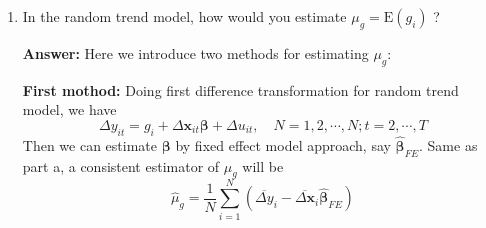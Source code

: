 \begin{enumerate}
\begin{enumerate}
        \item In the random trend model, how would you estimate $\mu_{g}=\mathrm{E}\left(g_{i}\right)$ ?
        
        \textbf{Answer:} Here we introduce two methods for estimating $\mu_g$:
        
        \textbf{First mothod:} Doing first difference transformation for random trend model, we have
        \[ \Delta y_{i t}=g_{i}+\Delta\mathbf{x}_{i t} \boldsymbol{\beta}+\Delta u_{i t},\quad N = 1,2,\cdots,N; t=2, \cdots, T \]
        Then we can estimate $\bm{\beta}$ by fixed effect model approach, say $\hat{\mathbf{\beta}}_{FE}$. Same as part a, a consistent estimator of $\mu_g$ will be
        \[\hat{\mu}_{g}=\frac{1}{N} \sum_{i=1}^{N}\left(\overline{\Delta y}_{i}-\overline{\Delta\mathbf{x}}_{i} \hat{\boldsymbol{\beta}}_{F E}\right)\]
        

\end{enumerate}
\end{enumerate}
